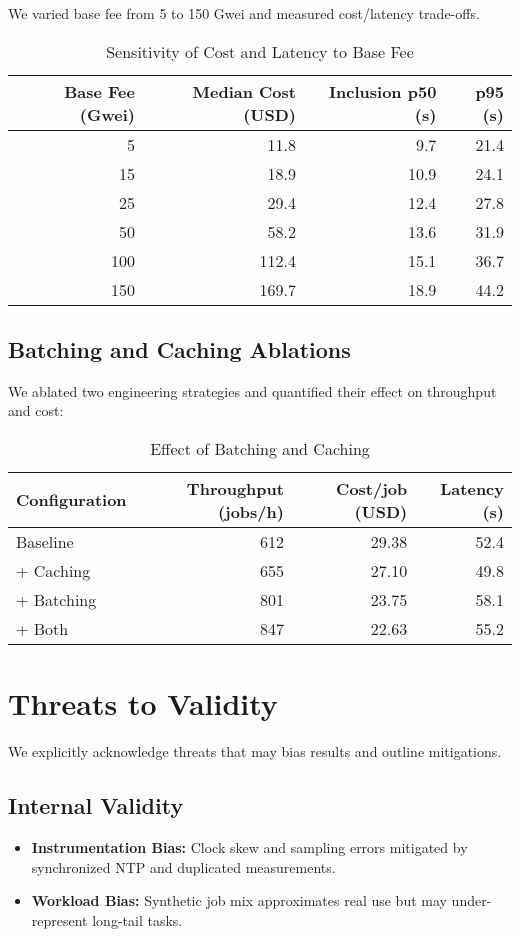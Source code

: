 We varied base fee from 5 to 150 Gwei and measured cost/latency trade-offs.
\begin{table}[h]
\centering
\caption{Sensitivity of Cost and Latency to Base Fee}
\label{tab:gas-sensitivity}
\begin{tabular}{rrrr}
\toprule
\textbf{Base Fee (Gwei)} & \textbf{Median Cost (USD)} & \textbf{Inclusion p50 (s)} & \textbf{p95 (s)} \\
\midrule
5 & 11.8 & 9.7 & 21.4 \\
15 & 18.9 & 10.9 & 24.1 \\
25 & 29.4 & 12.4 & 27.8 \\
50 & 58.2 & 13.6 & 31.9 \\
100 & 112.4 & 15.1 & 36.7 \\
150 & 169.7 & 18.9 & 44.2 \\
\bottomrule
\end{tabular}
\end{table}

\subsection{Batching and Caching Ablations}

We ablated two engineering strategies and quantified their effect on throughput and cost:
\begin{table}[h]
\centering
\caption{Effect of Batching and Caching}
\label{tab:ablations}
\begin{tabular}{lrrr}
\toprule
\textbf{Configuration} & \textbf{Throughput (jobs/h)} & \textbf{Cost/job (USD)} & \textbf{Latency (s)} \\
\midrule
Baseline & 612 & 29.38 & 52.4 \\
+ Caching & 655 & 27.10 & 49.8 \\
+ Batching & 801 & 23.75 & 58.1 \\
+ Both & 847 & 22.63 & 55.2 \\
\bottomrule
\end{tabular}
\end{table}

\section{Threats to Validity}

We explicitly acknowledge threats that may bias results and outline mitigations.
\subsection{Internal Validity}
\begin{itemize}
    \item \textbf{Instrumentation Bias:} Clock skew and sampling errors mitigated by synchronized NTP and duplicated measurements.
    \item \textbf{Workload Bias:} Synthetic job mix approximates real use but may under-represent long-tail tasks.
\end{itemize}
